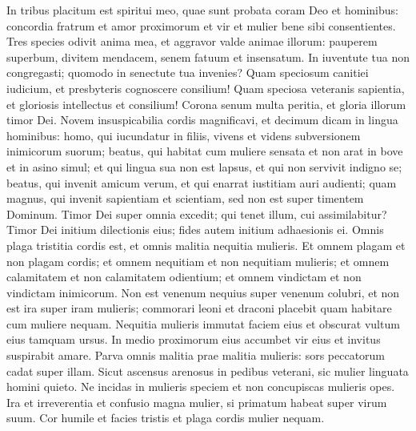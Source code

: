 \begin{biblechapter}
\begin{biblechapter}
\begin{biblechapter}
\begin{biblechapter}
\begin{biblechapter}
\begin{biblechapter}
\begin{biblechapter}
\begin{biblechapter}
\begin{biblechapter}
\begin{biblechapter}
\begin{biblechapter}
\begin{biblechapter}
\begin{biblechapter}
\begin{biblechapter}
\begin{biblechapter}
\begin{biblechapter}
\begin{biblechapter}
\begin{biblechapter}
\begin{biblechapter}
\begin{biblechapter}
\begin{biblechapter}
\begin{biblechapter}
\begin{biblechapter}
\begin{biblechapter}
\begin{biblechapter}
\verse In tribus placitum est spiritui meo,
 quae sunt probata coram Deo et hominibus:
 \verse concordia fratrum et amor proximorum
 et vir et mulier bene sibi consentientes.
 \verse Tres species odivit anima mea,
 et aggravor valde animae illorum:
 \verse pauperem superbum, divitem mendacem,
 senem fatuum et insensatum.
 \verse In iuventute tua non congregasti;
 quomodo in senectute tua invenies?
 \verse Quam speciosum canitiei iudicium,
 et presbyteris cognoscere consilium!
 \verse Quam speciosa veteranis sapientia,
 et gloriosis intellectus et consilium!
 \verse Corona senum multa peritia,
 et gloria illorum timor Dei.
 \verse Novem insuspicabilia cordis magnificavi,
 et decimum dicam in lingua hominibus:
 \verse homo, qui iucundatur in filiis,
 vivens et videns subversionem inimicorum suorum;
 \verse beatus, qui habitat cum muliere sensata
 et non arat in bove et in asino simul;
 et qui lingua sua non est lapsus,
 et qui non servivit indigno se;
 \verse beatus, qui invenit amicum verum,
 et qui enarrat iustitiam auri audienti;
 \verse quam magnus, qui invenit sapientiam et scientiam,
 sed non est super timentem Dominum.
 \verse Timor Dei super omnia excedit;
 \verse qui tenet illum, cui assimilabitur?
 \verse Timor Dei initium dilectionis eius;
 fides autem initium adhaesionis ei.
 \verse Omnis plaga tristitia cordis est,
 et omnis malitia nequitia mulieris.
 \verse Et omnem plagam et non plagam cordis;
 \verse et omnem nequitiam et non nequitiam mulieris;
 \verse et omnem calamitatem et non calamitatem odientium;
 \verse et omnem vindictam et non vindictam inimicorum.
 \verse Non est venenum nequius super venenum colubri,
 \verse et non est ira super iram mulieris;
 commorari leoni et draconi placebit
 quam habitare cum muliere nequam.
 \verse Nequitia mulieris immutat faciem eius
 et obscurat vultum eius tamquam ursus.
 In medio proximorum eius accumbet vir eius
 \verse et invitus suspirabit amare.
 \verse Parva omnis malitia prae malitia mulieris:
 sors peccatorum cadat super illam.
 \verse Sicut ascensus arenosus in pedibus veterani,
 sic mulier linguata homini quieto.
 \verse Ne incidas in mulieris speciem
 et non concupiscas mulieris opes.
 \verse Ira et irreverentia et confusio magna
 \verse mulier, si primatum habeat super virum suum.
 \verse Cor humile et facies tristis
 et plaga cordis mulier nequam.

\end{biblechapter}
\end{biblechapter}
\end{biblechapter}
\end{biblechapter}
\end{biblechapter}
\end{biblechapter}
\end{biblechapter}
\end{biblechapter}
\end{biblechapter}
\end{biblechapter}
\end{biblechapter}
\end{biblechapter}
\end{biblechapter}
\end{biblechapter}
\end{biblechapter}
\end{biblechapter}
\end{biblechapter}
\end{biblechapter}
\end{biblechapter}
\end{biblechapter}
\end{biblechapter}
\end{biblechapter}
\end{biblechapter}
\end{biblechapter}
\end{biblechapter}
